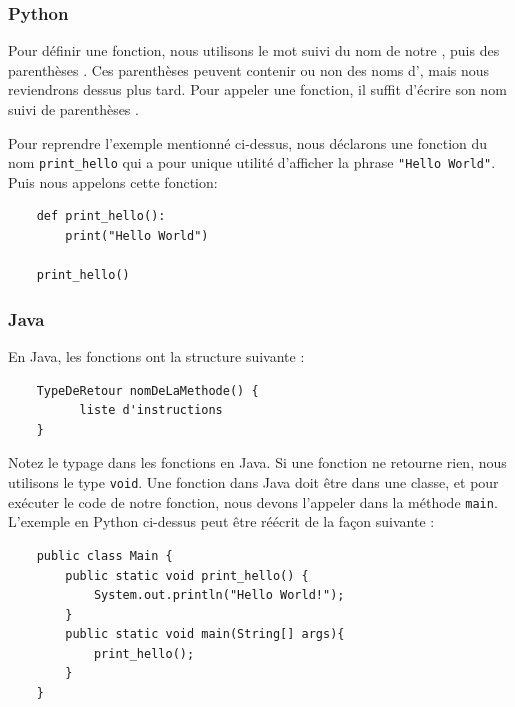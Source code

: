 \subsubsection{Python}
Pour définir une fonction, nous utilisons le mot  suivi du nom de notre , puis des parenthèses \codeword{()}. Ces parenthèses peuvent contenir ou non des noms d', mais nous reviendrons dessus plus tard. Pour appeler une fonction, il suffit d'écrire son nom suivi de parenthèses \codeword{()}.

Pour reprendre l'exemple mentionné ci-dessus, nous déclarons une fonction du nom \lstinline{print_hello} qui a pour unique utilité d'afficher la phrase \lstinline{"Hello World"}. Puis nous appelons cette fonction:\\

\begin{verbatim}
    def print_hello():
        print("Hello World")
        
    print_hello()
\end{verbatim}

\subsubsection{Java}
En Java, les fonctions ont la structure suivante :

\begin{verbatim}
    TypeDeRetour nomDeLaMethode() {
          liste d'instructions
    }
\end{verbatim}

Notez le typage dans les fonctions en Java. Si une fonction ne retourne rien, nous utilisons le type \lstinline{void}. Une fonction dans Java doit être dans une classe, et pour exécuter le code de notre fonction, nous devons l'appeler dans la méthode \lstinline{main}. L'exemple en Python ci-dessus peut être réécrit de la façon suivante :  

\begin{verbatim}
    public class Main {
        public static void print_hello() {
            System.out.println("Hello World!"); 
        }
        public static void main(String[] args){
            print_hello();
        }
    }
\end{verbatim}


